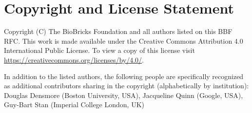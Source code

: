 \section{Copyright and License Statement}


Copyright (C) The BioBricks Foundation and all authors listed on this BBF RFC. This work is made available under the Creative Commons Attribution 4.0 International Public License. To view a copy of this license visit \href{https://creativecommons.org/licenses/by/4.0/}{https://creativecommons.org/licenses/by/4.0/}.

In addition to the listed authors, the following people are specifically recognized as additional contributors sharing in the copyright (alphabetically by institution):
Douglas Densmore (Boston University, USA), 
Jacqueline Quinn (Google, USA),
Guy-Bart Stan (Imperial College London, UK)